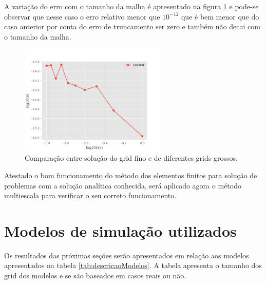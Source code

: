 A variação do erro com o tamanho da malha é apresentado na figura \ref{fig:SecondErrorTestSimpleShear} e pode-se observar que
nesse caso o erro relativo menor que $10^{-12}$ que é bem menor que do caso anterior por conta do erro de truncamento ser zero e também
não decai com o tamanho da malha.

\begin{figure}[!htbp]
    \label{fig:SecondErrorTestSimpleShear}
    \centering
    \includegraphics[width=7cm]{chap08/figs/SecondErrorTestSimpleShear.png}
    \caption{Comparação entre solução do grid fino e de diferentes grids grossos.}
\end{figure}

Atestado o bom funcionamento do método dos elementos finitos para solução de problemas com a solução
analítica conhecida, será aplicado agora o método multiescala para verificar o seu correto funcionamento.

\section{Modelos de simulação utilizados}

Os resultados das próximas seções serão apresentados em relação aos modelos apresentados na tabela \ref{tab:descricaoModelos}. 
A tabela apresenta o tamanho dos grid dos modelos e se são baseados em casos reais ou não.


